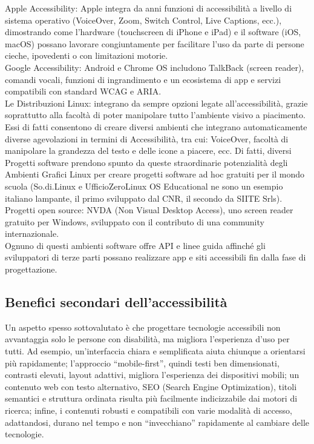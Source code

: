 \documentclass[14pt]{extbook}
\begin{document}
Apple Accessibility: Apple integra da anni funzioni di accessibilità a livello di sistema operativo (VoiceOver, Zoom, Switch Control, Live Captions, ecc.), dimostrando come l’hardware (touchscreen di iPhone e iPad) e il software (iOS, macOS) possano lavorare congiuntamente per facilitare l’uso da parte di persone cieche, ipovedenti o con limitazioni motorie.\\

Google Accessibility: Android e Chrome OS includono TalkBack (screen reader), comandi vocali, funzioni di ingrandimento e un ecosistema di app e servizi compatibili con standard WCAG e ARIA.\\

Le Distribuzioni Linux: integrano da sempre opzioni legate all'accessibilità, grazie soprattutto alla facoltà di poter manipolare tutto l'ambiente visivo a piacimento. Essi di fatti consentono di creare diversi ambienti che integrano automaticamente diverse agevolazioni in termini di Accessibilità, tra cui: VoiceOver, facoltà di manipolare la grandezza del testo e delle icone a piacere, ecc. Di fatti, diversi Progetti software prendono spunto da queste straordinarie potenzialità degli Ambienti Grafici Linux per creare progetti software ad hoc gratuiti per il mondo scuola (So.di.Linux e UfficioZeroLinux OS Educational ne sono un esempio italiano lampante, il primo sviluppato dal CNR, il secondo da SIITE Srls).\\

Progetti open source: NVDA (Non Visual Desktop Access), uno screen reader gratuito per Windows, sviluppato con il contributo di una community internazionale.\\

Ognuno di questi ambienti software offre API e linee guida affinché gli sviluppatori di terze parti possano realizzare app e siti accessibili fin dalla fase di progettazione.

\subsection{Benefici secondari dell’accessibilità}
Un aspetto spesso sottovalutato è che progettare tecnologie accessibili non avvantaggia solo le persone con disabilità, ma migliora l’esperienza d’uso per tutti. Ad esempio, un’interfaccia chiara e semplificata aiuta chiunque a orientarsi più rapidamente; l’approccio “mobile-first”, quindi testi ben dimensionati, contrasti elevati, layout adattivi, migliora l’esperienza dei dispositivi mobili; un contenuto web con testo alternativo, SEO (Search Engine Optimization), titoli semantici e struttura ordinata risulta più facilmente indicizzabile dai motori di ricerca; infine, i contenuti robusti e compatibili con varie modalità di accesso, adattandosi, durano nel tempo e non “invecchiano” rapidamente al cambiare delle tecnologie.
\end{document}
